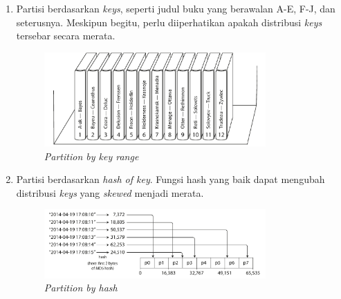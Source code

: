 \begin{enumerate}
    \item Partisi berdasarkan \textit{keys}, seperti judul buku yang berawalan A-E, F-J, dan seterusnya. Meskipun begitu, perlu diiperhatikan apakah distribusi \textit{keys} tersebar secara merata.
          \begin{figure}[ht]
              \centering
              \includegraphics[width=0.8\textwidth]{resources/chapter-2/partition-by-key-range.png}
              \caption{\textit{Partition by key range \parencite{dataIntensiveApplications}}}
              \label{fig: partition-by-key-range}
          \end{figure}

    \item Partisi berdasarkan \textit{hash of key}. Fungsi hash yang baik dapat mengubah distribusi \textit{keys} yang \textit{skewed} menjadi merata.
          \begin{figure}[ht]
              \centering
              \includegraphics[width=0.8\textwidth]{resources/chapter-2/partition-by-hash.png}
              \caption{\textit{Partition by hash \parencite{dataIntensiveApplications}}}
              \label{fig:partition-by-hash}
          \end{figure}

\end{enumerate}